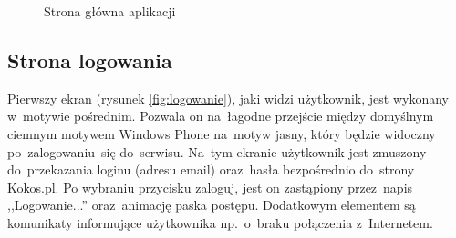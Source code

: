 \documentclass[a4paper,twoside,titlepage,openright]{book}
\begin{document}
\begin{figure}[h!]
\begin{minipage}[t]{0.3\textwidth}
		\caption{Strona główna aplikacji}
		\label{fig:stronaGlowna}
	\end{minipage}
\end{figure}


\subsection{Strona logowania}
Pierwszy ekran (rysunek \ref{fig:logowanie}), jaki widzi użytkownik, jest wykonany w~motywie pośrednim. Pozwala on na~łagodne przejście między domyślnym ciemnym motywem Windows Phone na~motyw jasny, który będzie widoczny po~zalogowaniu~się do~serwisu. Na~tym ekranie użytkownik jest zmuszony do~przekazania loginu (adresu email) oraz~hasła bezpośrednio do~strony Kokos.pl. Po wybraniu przycisku zaloguj, jest on zastąpiony przez~napis ,,Logowanie...'' oraz~animację paska postępu. Dodatkowym elementem są komunikaty informujące użytkownika np.~o~braku połączenia z~Internetem.
\end{document}
